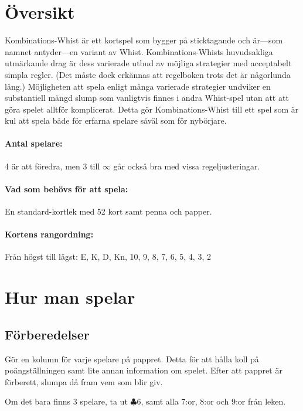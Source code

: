 \documentclass[a4paper]{article}
\author{Av Joakim Nilsson}
\date{Utvecklingsversion (baserad på version \varVersion-\varLanguage)---\today}
\date{Version \varVersion-\varLanguage\---\today}
\begin{document}

	\introPages
	\pagebreak


	\section{Översikt}
		Kombinations-Whist är ett kortspel som bygger på sticktagande och är---som namnet antyder---en variant av Whist. Kombinations-Whists huvudsakliga utmärkande drag är dess varierade utbud av möjliga strategier med acceptabelt simpla regler. (Det måste dock erkännas att regelboken trots det är någorlunda lång.) Möjligheten att spela enligt många varierade strategier undviker en substantiell mängd slump som vanligtvis finnes i andra Whist-spel utan att att göra spelet alltför komplicerat. Detta gör Kombinations-Whist till ett spel som är kul att spela både för erfarna spelare såväl som för nybörjare.

		\paragraph{Antal spelare:}
		4 är att föredra, men 3 till $\infty$ går också bra med vissa regeljusteringar.

		\paragraph{Vad som behövs för att spela:}
		En standard-kortlek med 52 kort samt penna och papper.

		\paragraph{Kortens rangordning:}
		Från högst till lägst: E, K, D, Kn, 10, 9, 8, 7, 6, 5, 4, 3, 2

	\section{Hur man spelar}
		\subsection{Förberedelser}
			Gör en kolumn för varje spelare på pappret. Detta för att hålla koll på poängställningen samt lite annan information om spelet. Efter att pappret är förberett, slumpa då fram vem som blir giv.

			Om det bara finns 3 spelare, ta ut $\clubsuit 6$, samt alla 7:or, 8:or och 9:or från leken.
\end{document}
